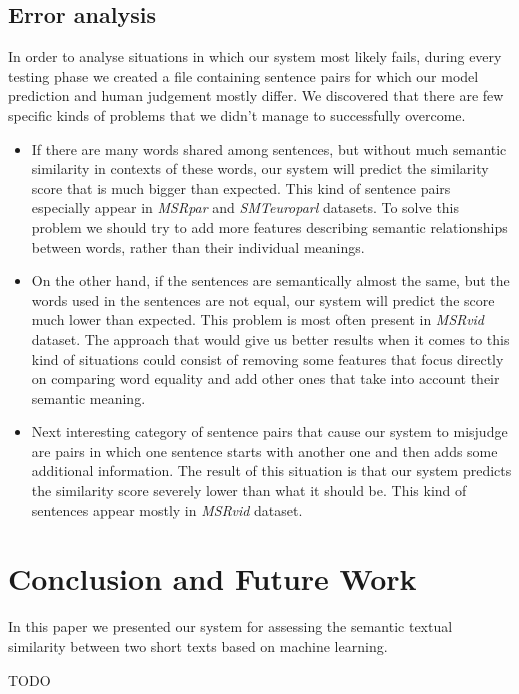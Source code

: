 \documentclass[10pt, a4paper]{article}
\begin{document}
\subsection{Error analysis}

In order to analyse situations in which our system most likely fails, during every testing phase we created a file containing sentence pairs for which our model prediction and human judgement mostly differ. We discovered that there are few specific kinds of problems that we didn't manage to successfully overcome.

\begin{itemize} \itemsep1pt \parskip0pt 
	\item If there are many words shared among sentences, but without much semantic similarity in contexts of these words, our system will predict the similarity score that is much bigger than expected. This kind of sentence pairs especially appear in \textit{MSRpar} and \textit{SMTeuroparl} datasets. To solve this problem we should try to add more features describing semantic relationships between words, rather than their individual meanings.
	
	\item On the other hand, if the sentences are semantically almost the same, but the words used in the sentences are not equal, our system will predict the score much lower than expected. This problem is most often present in \textit{MSRvid} dataset. The approach that would give us better results when it comes to this kind of situations could consist of removing some features that focus directly on comparing word equality and add other ones that take into account their semantic meaning.
	
	\item Next interesting category of sentence pairs that cause our system to misjudge are pairs in which one sentence starts with another one and then adds some additional information. The result of this situation is that our system predicts the similarity score  severely lower than what it should be. This kind of sentences appear mostly in \textit{MSRvid} dataset.
\end{itemize}

\section{Conclusion and Future Work}

In this paper we presented our system for assessing the semantic textual similarity between two short texts based on machine learning. 

TODO

\nocite{*}

 
\end{document}
